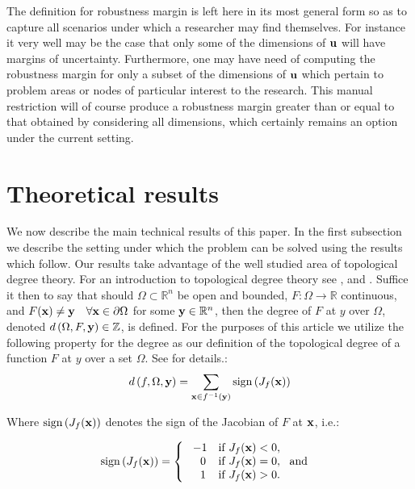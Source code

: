\documentclass[11pt]{article}
\theoremstyle{plain}
\theoremstyle{definition}
\theoremstyle{remark}
\begin{document}
The definition for robustness margin is left here in its most general form so as to capture all scenarios under which a researcher may find themselves. 
For instance it very well may be the case that only some of the dimensions of $\bold u$ will have margins of uncertainty. 
Furthermore, one may have need of computing the robustness margin for only a subset of the dimensions of $\bold u$ which pertain to problem areas or nodes of particular interest to the research. 
This manual restriction will of course produce a robustness margin greater than or equal to that obtained by considering all dimensions, which certainly remains an option under the current setting. 

\section{Theoretical results}
We now describe the main technical results of this paper. 
In the first subsection we describe the setting under which the problem can be solved using the results which follow. Our results take advantage of the well studied area of topological degree theory. 
For an introduction to topological degree theory see \cite{OrChCh2006}, \cite{fonseca1995degree} and \cite{MoVrYa2002}. 
Suffice it then to say that should $\Omega\subset\mathbb{R}^{n}$ be open and bounded, $F:\Omega\rightarrow \mathbb{R}$ continuous, and $F(\bold x)\neq \bold y \quad \forall \bold x\in\partial\Omega$ for some $\bold y\in\mathbb{R}^n$, then the degree of $F$ at $y$ over $\Omega$, denoted $d\left(\Omega,F,\bold y\right)\in\mathbb{Z}$, is defined. 
For the purposes of this article we utilize the following property for the degree as our definition of the topological degree of a function $F$ at $y$ over a set $\Omega$. 
See \cite{OrChCh2006} for details.:
\begin{equation}\label{eq:Deg3}
d\left(f,\Omega,\bold y\right)=\sum\limits_{\bold x\in f^{-1}(\bold y)}\operatorname{sign}\left(J_f(\bold x)\right)
\end{equation}

Where $\operatorname{sign}\left(J_f(\bold x)\right)$ denotes the sign of the Jacobian of $F$ at $\bold x$, i.e.:

\[\operatorname{sign}\left(J_f(\bold x)\right)=   \left\{
\begin{array}{ll}
       \ -1   & \mbox{if } J_f(\bold x)< 0, \\
      \quad 0 & \mbox{if } J_f(\bold x)= 0,~\mbox{ and } \\
      \quad 1 & \mbox{if } J_f(\bold x)> 0. \\
\end{array} 
\right. \]
\end{document}

